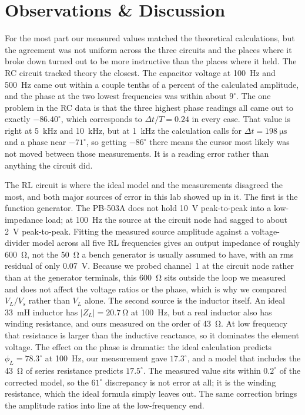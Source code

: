 \documentclass[11pt]{article}
\begin{document}
\section*{Observations \& Discussion}

For the most part our measured values matched the theoretical calculations, but
the agreement was not uniform across the three circuits and the places where it
broke down turned out to be more instructive than the places where it held. The
RC circuit tracked theory the closest. The capacitor voltage at \SI{100}{\hertz}
and \SI{500}{\hertz} came out within a couple tenths of a percent of the
calculated amplitude, and the phase at the two lowest frequencies was within
about $9^\circ$. The one problem in the RC data is that the three highest phase
readings all came out to exactly $-86.40^\circ$, which corresponds to
$\Delta t / T = 0.24$ in every case. That value is right at \SI{5}{\kilo\hertz}
and \SI{10}{\kilo\hertz}, but at \SI{1}{\kilo\hertz} the calculation calls for
$\Delta t = \SI{198}{\micro\second}$ and a phase near $-71^\circ$, so getting
$-86^\circ$ there means the cursor most likely was not moved between those
measurements. It is a reading error rather than anything the circuit did.

The RL circuit is where the ideal model and the measurements disagreed the most,
and both major sources of error in this lab showed up in it. The first is the
function generator. The PB-503A does not hold \SI{10}{\volt} peak-to-peak into a
low-impedance load; at \SI{100}{\hertz} the source at the circuit node had sagged
to about \SI{2}{\volt} peak-to-peak. Fitting the measured source amplitude
against a voltage-divider model across all five RL frequencies gives an output
impedance of roughly \SI{600}{\ohm}, not the \SI{50}{\ohm} a bench generator is
usually assumed to have, with an rms residual of only \SI{0.07}{\volt}. Because
we probed channel~1 at the circuit node rather than at the generator terminals,
this \SI{600}{\ohm} sits outside the loop we measured and does not affect the
voltage ratios or the phase, which is why we compared $V_L / V_s$ rather than
$V_L$ alone. The second source is the inductor itself. An ideal \SI{33}{\milli\henry}
inductor has $|Z_L| = \SI{20.7}{\ohm}$ at \SI{100}{\hertz}, but a real inductor
also has winding resistance, and ours measured on the order of \SI{43}{\ohm}. At
low frequency that resistance is larger than the inductive reactance, so it
dominates the element voltage. The effect on the phase is dramatic: the ideal
calculation predicts $\phi_L = 78.3^\circ$ at \SI{100}{\hertz}, our measurement
gave $17.3^\circ$, and a model that includes the \SI{43}{\ohm} of series
resistance predicts $17.5^\circ$. The measured value sits within $0.2^\circ$ of
the corrected model, so the $61^\circ$ discrepancy is not error at all; it is the
winding resistance, which the ideal formula simply leaves out. The same
correction brings the amplitude ratios into line at the low-frequency end.
\end{document}
